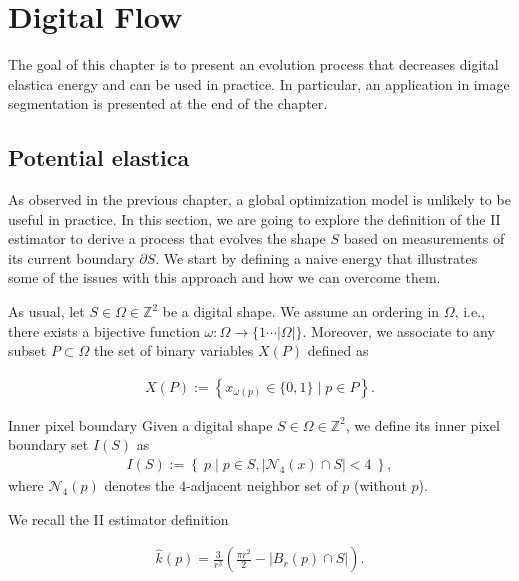 \chapter{Digital Flow}
\label{chapter:digital-flow}

The goal of this chapter is to present an evolution process that decreases digital elastica energy and can be used in practice. In particular, an application in image segmentation is presented at the end of the chapter. 

\section{Potential elastica}

As observed in the previous chapter, a global optimization model is unlikely to be useful in practice. In this section, we are going to explore the definition of the II estimator to derive a process that evolves the shape $S$ based on measurements of its current boundary $\partial S$. We start by defining a naive energy that illustrates some of the issues with this approach and how we can overcome them.

As usual, let $S \in \Omega \in \mathbb{Z}^2$ be a digital shape. We assume an ordering in $\Omega$, i.e., there exists a bijective function $\omega : \Omega \rightarrow \{1 \cdots |\Omega| \}$. Moreover, we associate to any subset $P \subset \Omega$ the set of binary variables $X(P)$ defined as

\begin{align*}
	X(P) := \left\{ x_{\omega(p)} \in \{0,1\} \; | \; p \in P \right\}.
\end{align*}

\begin{definition}{Inner pixel boundary}
Given a digital shape $S \in \Omega \in \mathbb{Z}^2$, we define its inner pixel boundary set $I(S)$ as
\begin{align*}
	I(S) := \left\{ \: p \; | \; p \in S, |\mathcal{N}_4(x) \cap S|<4 \: \right\},
\end{align*}
where $\mathcal{N}_4(p)$ denotes the $4$-adjacent neighbor set of $p$ (without $p$).
\end{definition}


We recall the II estimator definition

\begin{align*}
	\hat{k}(p) = \frac{3}{r^3}\left( \frac{\pi r^2}{2} - |B_r(p) \cap S| \right).
\end{align*}

